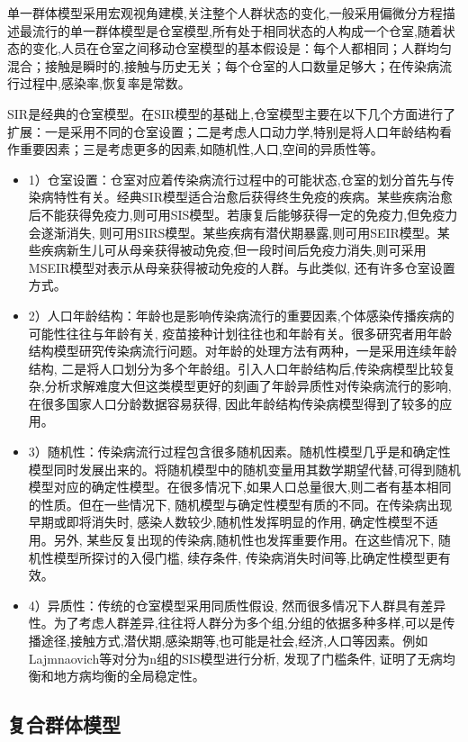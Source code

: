 \documentclass[12pt]{report}
\begin{document}
		单一群体模型采用宏观视角建模,关注整个人群状态的变化,一般采用偏微分方程描述最流行的单一群体模型是仓室模型,所有处于相同状态的人构成一个仓室,随着状态的变化,人员在仓室之间移动仓室模型的基本假设是：每个人都相同；人群均匀混合；接触是瞬时的,接触与历史无关；每个仓室的人口数量足够大；在传染病流行过程中,感染率,恢复率是常数。
		\par\setlength\parindent{2em}SIR是经典的仓室模型。在SIR模型的基础上,仓室模型主要在以下几个方面进行了扩展：一是采用不同的仓室设置；二是考虑人口动力学,特别是将人口年龄结构看作重要因素；三是考虑更多的因素,如随机性,人口,空间的异质性等。
		\begin{itemize}
			\item 1）仓室设置：仓室对应着传染病流行过程中的可能状态,仓室的划分首先与传染病特性有关。经典SIR模型适合治愈后获得终生免疫的疾病。某些疾病治愈后不能获得免疫力,则可用SIS模型。若康复后能够获得一定的免疫力,但免疫力会遂渐消失, 则可用SIRS模型。某些疾病有潜伏期暴露,则可用SEIR模型。某些疾病新生儿可从母亲获得被动免疫,但一段时间后免疫力消失,则可采用MSEIR模型对表示从母亲获得被动免疫的人群。与此类似, 还有许多仓室设置方式。
			\item 2）人口年龄结构：年龄也是影响传染病流行的重要因素,个体感染传播疾病的可能性往往与年龄有关, 疫苗接种计划往往也和年龄有关。很多研究者用年龄结构模型研究传染病流行问题。对年龄的处理方法有两种，一是采用连续年龄结构, 二是将人口划分为多个年龄组。引入人口年龄结构后,传染病模型比较复杂,分析求解难度大但这类模型更好的刻画了年龄异质性对传染病流行的影响, 在很多国家人口分龄数据容易获得, 因此年龄结构传染病模型得到了较多的应用。			
			\item 3）随机性：传染病流行过程包含很多随机因素。随机性模型几乎是和确定性模型同时发展出来的。将随机模型中的随机变量用其数学期望代替,可得到随机模型对应的确定性模型。在很多情况下,如果人口总量很大,则二者有基本相同的性质。但在一些情况下, 随机模型与确定性模型有质的不同。在传染病出现早期或即将消失时, 感染人数较少,随机性发挥明显的作用, 确定性模型不适用。另外, 某些反复出现的传染病,随机性也发挥重要作用。在这些情况下, 随机性模型所探讨的入侵门槛, 续存条件, 传染病消失时间等,比确定性模型更有效。		
			\item 4）异质性：传统的仓室模型采用同质性假设, 然而很多情况下人群具有差异性。为了考虑人群差异,往往将人群分为多个组,分组的依据多种多样,可以是传播途径,接触方式,潜伏期,感染期等,也可能是社会,经济,人口等因素。例如Lajmnaovich等对分为n组的SIS模型进行分析, 发现了门槛条件, 证明了无病均衡和地方病均衡的全局稳定性。
		\end{itemize}
		
		
		\subsection{复合群体模型}
		
\end{document}
